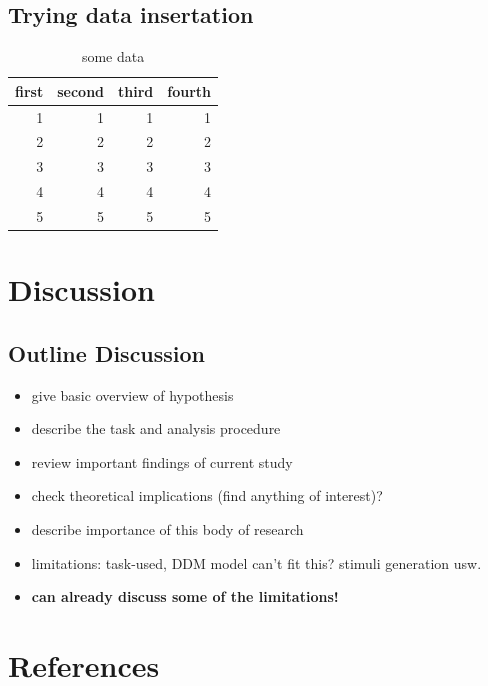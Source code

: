 \documentclass[
  man,floatsintext]{apa7}
\providecommand{\tightlist}{%
  \setlength{\itemsep}{0pt}\setlength{\parskip}{0pt}}
\begin{document}
\hypertarget{trying-data-insertation}{%
\subsection{Trying data insertation}\label{trying-data-insertation}}

\begin{table}

\caption{\label{tab:display}some data}
\centering
\begin{tabular}[t]{r|r|r|r}
\hline
first & second & third & fourth\\
\hline
1 & 1 & 1 & 1\\
\hline
2 & 2 & 2 & 2\\
\hline
3 & 3 & 3 & 3\\
\hline
4 & 4 & 4 & 4\\
\hline
5 & 5 & 5 & 5\\
\hline
\end{tabular}
\end{table}

\hypertarget{discussion}{%
\section{Discussion}\label{discussion}}

\hypertarget{outline-discussion}{%
\subsection{Outline Discussion}\label{outline-discussion}}

\begin{itemize}
\tightlist
\item
  give basic overview of hypothesis
\item
  describe the task and analysis procedure
\item
  review important findings of current study
\item
  check theoretical implications (find anything of interest)?
\item
  describe importance of this body of research
\item
  limitations: task-used, DDM model can't fit this? stimuli generation usw.
\item
  \textbf{can already discuss some of the limitations!}
\end{itemize}

\newpage

\hypertarget{references}{%
\section{References}\label{references}}
\end{document}
